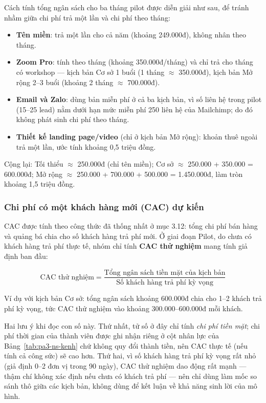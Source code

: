 Cách tính tổng ngân sách cho ba tháng pilot được diễn giải như sau, để tránh nhầm giữa chi phí trả một lần và chi phí theo tháng:

\begin{itemize}
    \item \textbf{Tên miền}: trả một lần cho cả năm (khoảng 249.000đ), không nhân theo tháng.
    \item \textbf{Zoom Pro}: tính theo tháng (khoảng 350.000đ/tháng) và chỉ trả cho tháng có workshop --- kịch bản Cơ sở 1 buổi (1 tháng $\approx$ 350.000đ), kịch bản Mở rộng 2--3 buổi (khoảng 2 tháng $\approx$ 700.000đ).
    \item \textbf{Email và Zalo}: dùng bản miễn phí ở cả ba kịch bản, vì số liên hệ trong pilot (15--25 lead) nằm dưới hạn mức miễn phí 250 liên hệ của Mailchimp; do đó không phát sinh chi phí theo tháng.
    \item \textbf{Thiết kế landing page/video} (chỉ ở kịch bản Mở rộng): khoản thuê ngoài trả một lần, ước tính khoảng 0,5 triệu đồng.
\end{itemize}

Cộng lại: Tối thiểu $\approx$ 250.000đ (chỉ tên miền); Cơ sở $\approx$ 250.000 + 350.000 = 600.000đ; Mở rộng $\approx$ 250.000 + 700.000 + 500.000 = 1.450.000đ, làm tròn khoảng 1,5 triệu đồng.

\subsubsection{Chi phí có một khách hàng mới (CAC) dự kiến}

CAC được tính theo công thức đã thống nhất ở mục 3.12: tổng chi phí bán hàng và quảng bá chia cho số khách hàng trả phí mới. Ở giai đoạn Pilot, do chưa có khách hàng trả phí thực tế, nhóm chỉ tính \textbf{CAC thử nghiệm} mang tính giả định ban đầu:

\begin{NoteBox}
$$\text{CAC thử nghiệm} = \dfrac{\text{Tổng ngân sách tiền mặt của kịch bản}}{\text{Số khách hàng trả phí kỳ vọng}}$$
\end{NoteBox}

Ví dụ với kịch bản Cơ sở: tổng ngân sách khoảng 600.000đ chia cho 1--2 khách trả phí kỳ vọng, tức CAC thử nghiệm vào khoảng 300.000--600.000đ mỗi khách.

Hai lưu ý khi đọc con số này. Thứ nhất, tử số ở đây chỉ tính \emph{chi phí tiền mặt}; chi phí thời gian của thành viên được ghi nhận riêng ở cột nhân lực của Bảng~\ref{tab:pa3-ns-kenh} chứ không quy đổi thành tiền, nên CAC thực tế (nếu tính cả công sức) sẽ cao hơn. Thứ hai, vì số khách hàng trả phí kỳ vọng rất nhỏ (giả định 0--2 đơn vị trong 90 ngày), CAC thử nghiệm dao động rất mạnh --- thậm chí không xác định nếu chưa có khách trả phí --- nên chỉ dùng làm mốc so sánh thô giữa các kịch bản, không dùng để kết luận về khả năng sinh lời của mô hình.
